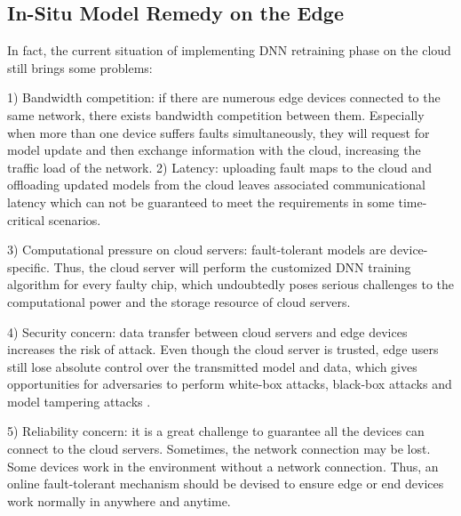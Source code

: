 \subsection{In-Situ Model Remedy on the Edge}
In fact, the current situation of implementing DNN retraining phase on the cloud still brings some problems: 

1) Bandwidth competition: if there are numerous edge devices connected to the same network, there exists bandwidth competition between them. Especially when more than one device suffers faults simultaneously, they will request for model update and then exchange information with the cloud, increasing the traffic load of the network.                                                                                                                                                                                                                    
2) Latency:  uploading fault maps to the cloud and offloading updated models from the cloud leaves associated communicational latency which can not be guaranteed to meet the requirements in some time-critical scenarios.

3) Computational pressure on cloud servers: fault-tolerant models are device-specific. Thus, the cloud server will perform the customized DNN training algorithm for every faulty chip, which undoubtedly poses serious challenges to the computational power and the storage resource of cloud servers.

4) Security concern: data transfer between cloud servers and edge devices increases the risk of attack. Even though the cloud server is trusted, edge users still lose absolute control over the transmitted model and data, which gives opportunities for adversaries to perform white-box attacks, black-box attacks and model tampering attacks \cite{10.1145/3287624.3287695}.

5) Reliability concern:  it is a great challenge to guarantee all the devices can connect to the cloud servers. Sometimes, the network connection may be lost. Some devices work in the environment without a network connection. Thus, an online fault-tolerant mechanism should be devised to ensure edge or end devices work normally in anywhere and anytime.
                                                                                                                                                                                                                                                                                                                                    
